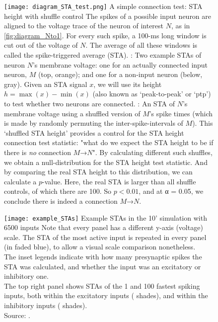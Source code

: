 \begin{figure}
    \hspace{-5em}
    \texttt{[image: diagram\_STA\_test.png]}
    \captionn
        {A simple connection test: STA height with shuffle control}
        {The spikes of a possible input neuron are aligned to the voltage trace of the neuron of interest $N$, as in \cref{fig:diagram_Nto1}. For every such spike, a 100-ms long window is cut out of the voltage of $N$. The average of all these windows is called the spike-triggered average (STA).\newline
        \Left: Two example STAs of neuron $N$'s membrane voltage: one for an actually connected input neuron, $M$ (top, orange); and one for a non-input neuron (below, gray).
        Given an STA signal $x$, we will use its height $h = \max(x) - \min(x)$ (also known as `peak-to-peak' or `ptp') to test whether two neurons are connected. \newline
        \Right: An STA of $N$'s membrane voltage using a shuffled version of $M$'s spike times (which is made by randomly permuting the inter-spike-intervals of $M$). This `shuffled STA height' provides a control for the STA height connection test statistic: "what do we expect the STA height to be if there is \emph{no} connection $M$→$N$".
        By calculating different such shuffles, we obtain a null-distribution for the STA height test statistic. And by comparing the real STA height to this distribution, we can calculate a $p$-value. Here, the real STA is larger than all shuffle controls, of which there are 100. So $p < 0.01$, and at α = 0.05, we conclude there is indeed a connection $M$→$N$.}
    \label{fig:STA-height-suffle}
\end{figure}

\begin{figure}
    \hspace*{-3em}
    \texttt{[image: example\_STAs]}
    \vspace*{1em}
    \captionn
        {Example STAs in the 10' simulation with 6500 inputs}
        {
        Note that every panel has a different y-axis (voltage) scale. The STA of the most active input is repeated in every panel (in faded blue), to allow a visual scale comparison nonetheless.\\
        The inset legends indicate with how many presynaptic spikes the STA was calculated, and whether the input was an excitatory or inhibitory one.\\
        The top right panel shows STAs of the 1 and 100 fastest spiking inputs, both within the excitatory inputs ( shades), and within the inhibitory inputs ( shades).\\
        Source: .
        }
    \label{fig:example_STAs}
\end{figure}


